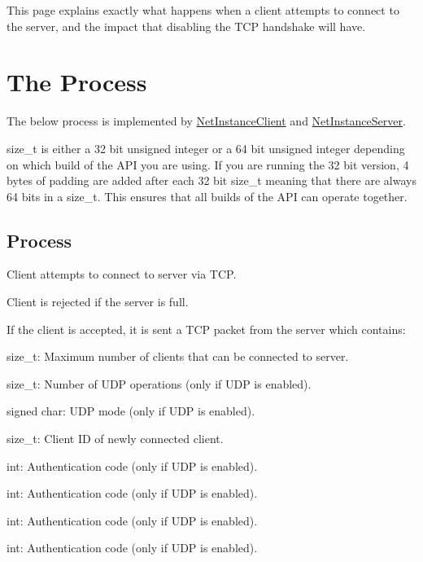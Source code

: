 This page explains exactly what happens when a client attempts to connect to the server, and the impact that disabling the TCP handshake will have.\par
\par
\hypertarget{handshake_page_handshakeProcess}{}\section{The Process}\label{handshake_page_handshakeProcess}
The below process is implemented by \hyperlink{class_net_instance_client}{NetInstanceClient} and \hyperlink{class_net_instance_server}{NetInstanceServer}. \par
\par


size\_\-t is either a 32 bit unsigned integer or a 64 bit unsigned integer depending on which build of the API you are using. If you are running the 32 bit version, 4 bytes of padding are added after each 32 bit size\_\-t meaning that there are always 64 bits in a size\_\-t. This ensures that all builds of the API can operate together.\par
\par
\hypertarget{handshake_page_handshakeProcessActual}{}\subsection{Process}\label{handshake_page_handshakeProcessActual}

\begin{DoxyItemize}
\item Client attempts to connect to server via TCP.\par

\end{DoxyItemize}


\begin{DoxyItemize}
\item Client is rejected if the server is full.
\item If the client is accepted, it is sent a TCP packet from the server which contains:
\begin{DoxyItemize}
\item size\_\-t: Maximum number of clients that can be connected to server.
\item size\_\-t: Number of UDP operations (only if UDP is enabled).
\item signed char: UDP mode (only if UDP is enabled).
\item size\_\-t: Client ID of newly connected client.
\item int: Authentication code (only if UDP is enabled).
\item int: Authentication code (only if UDP is enabled).
\item int: Authentication code (only if UDP is enabled).
\item int: Authentication code (only if UDP is enabled).\par

\end{DoxyItemize}
\end{DoxyItemize}


